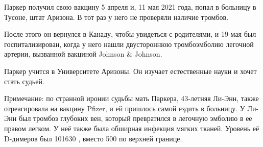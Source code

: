 Паркер получил свою вакцину 5 апреля и, 11 мая 2021 года, попал в больницу в
Тусоне, штат Аризона. В тот раз у него не проверяли наличие тромбов.

После этого он вернулся в Канаду, чтобы увидеться с родителями, и 19 мая был
госпитализирован, когда у него нашли двустороннюю тромбоэмболию легочной
артерии, вызванной вакциной Johnson \& Johnson.

Паркер учится в Университете Аризоны. Он изучает естественные науки и хочет
стать судьей.

Примечание: по странной иронии судьбы мать Паркера, 43-летняя Ли-Энн, также
отреагировала на вакцину Pfizer, и ей пришлось самой ездить в больницу. У Ли-Энн
был тромбоз глубоких вен, который превратился в легочную эмболию в ее правом
легком. У неё также была обширная инфекция мягких тканей. Уровень её D-димеров
был 101630 , вместо 500 по верхней границе.

